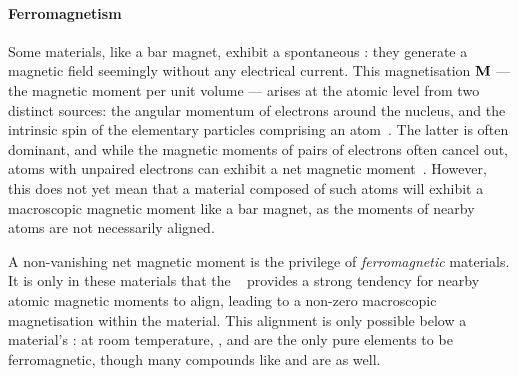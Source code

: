 \paragraph{Ferromagnetism}
Some materials, like a bar magnet, exhibit a spontaneous : they generate a magnetic field seemingly without any electrical current.
This magnetisation $\boldsymbol{\mathbf{M}}$ --- the magnetic moment per unit volume --- arises at the atomic level from two distinct sources: the angular momentum of electrons around the nucleus, and the intrinsic spin of the elementary particles comprising an atom~\cite{coey2010magnetism}.
The latter is often dominant, and while the magnetic moments of pairs of electrons often cancel out, atoms with unpaired electrons can exhibit a net magnetic moment~\cite{PhD_Leliaert}. %
However, this does not yet mean that a material composed of such atoms will exhibit a macroscopic magnetic moment like a bar magnet, as the moments of nearby atoms are not necessarily aligned. \par
A non-vanishing net magnetic moment is the privilege of \textit{ferromagnetic} materials.
It is only in these materials that the ~\cite{heisenberg1928theorie} provides a strong tendency for nearby atomic magnetic moments to align, leading to a non-zero macroscopic magnetisation within the material.
This alignment is only possible below a material's : at room temperature, ,  and  are the only pure elements to be ferromagnetic, though many compounds like  and  are as well.

